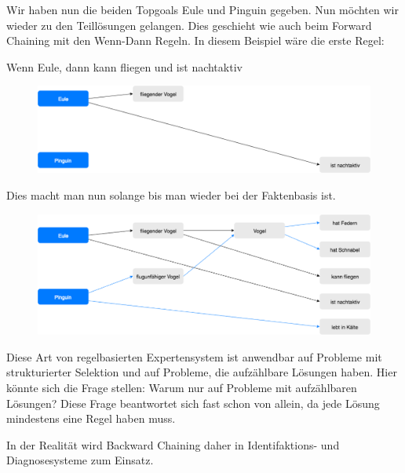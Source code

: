 Wir haben nun die beiden Topgoals Eule und Pinguin gegeben. Nun möchten wir wieder zu den Teillösungen gelangen. Dies geschieht wie auch beim Forward Chaining mit den Wenn-Dann Regeln. In diesem Beispiel wäre die erste Regel:

Wenn Eule, dann kann fliegen und ist nachtaktiv

\begin{figure}[H]
    \centering
    \includegraphics[width=17cm]{chapters/expertensysteme/backward_chaining/backward_chaining_2}
    \label{fig:backward_chaining_2}
\end{figure}

Dies macht man nun solange bis man wieder bei der Faktenbasis ist.

\begin{figure}[H]
    \centering
    \includegraphics[width=17cm]{chapters/expertensysteme/backward_chaining/backward_chaining_3}
    \label{fig:backward_chaining_3}
\end{figure}

\noindent Diese Art von regelbasierten Expertensystem ist anwendbar auf Probleme mit strukturierter Selektion und auf Probleme, die aufzählbare Lösungen haben. Hier könnte sich die Frage stellen: Warum nur auf Probleme mit aufzählbaren Lösungen? Diese Frage beantwortet sich fast schon von allein, da jede Lösung mindestens eine Regel haben muss.

\noindent In der Realität wird Backward Chaining daher in Identifaktions- und Diagnosesysteme zum Einsatz.



